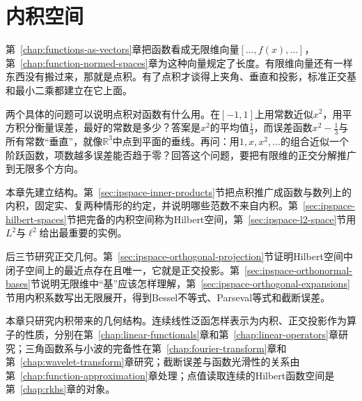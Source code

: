\chapter{内积空间}
\label{chap:function-inner-product-spaces}

第~\ref{chap:functions-as-vectors}章把函数看成无限维向量$[\ldots,f(x),\ldots]$，第~\ref{chap:function-normed-spaces}章为这种向量规定了长度。有限维向量还有一样东西没有搬过来，那就是点积。有了点积才谈得上夹角、垂直和投影，标准正交基和最小二乘都建立在它上面。

两个具体的问题可以说明点积对函数有什么用。在$[-1,1]$上用常数近似$x^2$，用平方积分衡量误差，最好的常数是多少？答案是$x^2$的平均值$\tfrac13$，而误差函数$x^2-\tfrac13$与所有常数“垂直”，就像$\mathbb R^3$中点到平面的垂线。再问：用$1,x,x^2,\ldots$的组合近似一个阶跃函数，项数越多误差能否趋于零？回答这个问题，要把有限维的正交分解推广到无限多个方向。

本章先建立结构。第~\ref{sec:ipspace-inner-products}节把点积推广成函数与数列上的内积，固定实、复两种情形的约定，并说明哪些范数不来自内积。第~\ref{sec:ipspace-hilbert-spaces}节把完备的内积空间称为Hilbert空间，第~\ref{sec:ipspace-l2-space}节用$L^2$与$\ell^2$给出最重要的实例。

后三节研究正交几何。第~\ref{sec:ipspace-orthogonal-projection}节证明Hilbert空间中闭子空间上的最近点存在且唯一，它就是正交投影。第~\ref{sec:ipspace-orthonormal-bases}节说明无限维中“基”应该怎样理解，第~\ref{sec:ipspace-orthogonal-expansions}节用内积系数写出无限展开，得到Bessel不等式、Parseval等式和截断误差。

本章只研究内积带来的几何结构。连续线性泛函怎样表示为内积、正交投影作为算子的性质，分别在第~\ref{chap:linear-functionals}章和第~\ref{chap:linear-operators}章研究；三角函数系与小波的完备性在第~\ref{chap:fourier-transform}章和第~\ref{chap:wavelet-transform}章研究；截断误差与函数光滑性的关系由第~\ref{chap:function-approximation}章处理；点值读取连续的Hilbert函数空间是第~\ref{chap:rkhs}章的对象。








